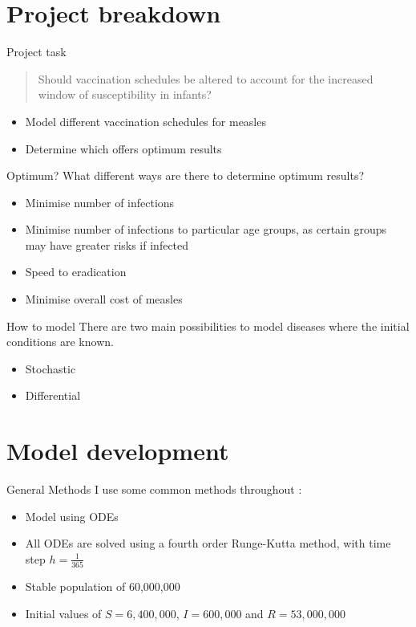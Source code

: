 \documentclass{beamer}
\begin{document}
\section{Project breakdown}
\begin{frame} {Project task}
\begin{quote}
Should vaccination schedules be altered to account for the increased window of susceptibility in infants?
\end{quote}

\begin{itemize}
\pause \item{\alert{Model} different vaccination schedules for measles}
\item{Determine which offers \alert{optimum} results}
\end{itemize}
\end{frame}

\begin{frame} {Optimum?}
What different ways are there to determine optimum results?
\begin{itemize}
 \item{Minimise number of infections}
 \item{Minimise number of infections to particular age groups, as certain groups may have greater risks if infected}
 \item{Speed to eradication}
 \item{Minimise overall cost of measles}
\end{itemize}
\end{frame}

\begin{frame} {How to model}
There are two main possibilities to model diseases where the initial conditions are known.
\begin{itemize}
\item{Stochastic}
\item{\alert{Differential}}
\end{itemize}
\end{frame}

\section{Model development}
\begin{frame} {General Methods}
I use some common methods throughout :
\begin{itemize}
\item{Model using ODEs}
\item{All ODEs are solved using a fourth order Runge-Kutta method, with time step $h=\frac{1}{365}$}
\item{Stable population of 60,000,000}
\item{Initial values of $S=6,400,000$, $I=600,000$ and $R=53,000,000$}
\end{itemize}
\end{frame}
\end{document}
